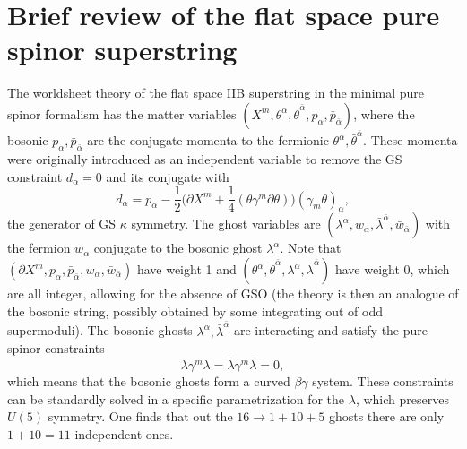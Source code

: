 \documentclass[12pt]{article}
\def\be{\begin{equation}}
\def\ee{\end{equation}}
\numberwithin{equation}{section}
\begin{document}
\section{Brief review of the flat space pure spinor superstring}
\label{flatReview}
The worldsheet theory of the flat space IIB superstring in the minimal pure spinor formalism has the matter variables $(X^m, \theta^\alpha,\bar{\theta}^{\bar{\alpha}}, p_\alpha, \bar{p}_{\bar{\alpha}})$, where the bosonic $p_\alpha, \bar{p}_{\bar{\alpha}}$ are the conjugate momenta to the fermionic $\theta^\alpha, \bar{\theta}^{\bar{\alpha}}$. These momenta were originally introduced as an independent variable to remove the GS constraint $d_\alpha = 0$ and its conjugate with
\be
d_\alpha = p_\alpha -\frac{1}{2}\big(\partial X^m + \frac{1}{4}(\theta \gamma^m \partial \theta)\big)(\gamma_m \theta)_\alpha,
\ee
the generator of GS $\kappa$ symmetry.
The ghost variables are $(\lambda^\alpha, w_\alpha, \bar{\lambda}^{\bar{\alpha}}, \bar{w}_{\bar{\alpha}})$ with the fermion $w_\alpha$ conjugate to the bosonic ghost $\lambda^\alpha$. Note that $(\partial X^m, p_\alpha, \bar{p}_{\bar{\alpha}}, w_\alpha, \bar{w}_{\bar{\alpha}})$ have weight 1 and $(\theta^\alpha, \bar{\theta}^{\bar{\alpha}}, \lambda^\alpha, \bar{\lambda}^{\bar{\alpha}})$ have weight 0, which are all integer, allowing for the absence of GSO (the theory is then an analogue of the bosonic string, possibly obtained by some integrating out of odd supermoduli). The bosonic ghosts $\lambda^\alpha, \bar{\lambda}^{\bar{\alpha}}$ are interacting and satisfy the pure spinor constraints
\be
\label{lambdaConstraints}
\lambda \gamma^m \lambda = \bar{\lambda} \gamma^m \bar{\lambda} = 0,
\ee
which means that the bosonic ghosts form a curved $\beta\gamma$ system.
These constraints can be standardly solved in a specific parametrization for the $\lambda$, which preserves $U(5)$ symmetry. One finds that out the $16 \to 1 + 10 + 5$ ghosts there are only $1 + 10 = 11$ independent ones.
\end{document}
